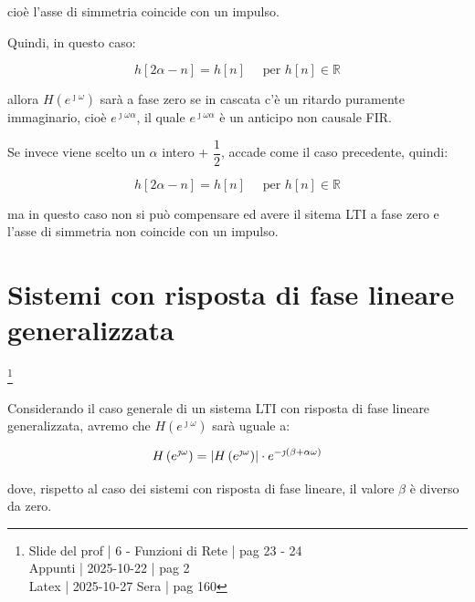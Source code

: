 cioè l'asse di simmetria coincide con un impulso. \newline 

Quindi, in questo caso: 

{
    \Large 
    \begin{equation}
        h \left[ 2 \alpha - n\right] = h \left[ n\right] \quad \text{ per } h \left[ n\right] \in \mathbb{R}
    \end{equation}
}

allora $H \left( e^{\jmath \omega}\right) $ sarà a fase zero se in cascata c'è un ritardo puramente immaginario, cioè $e^{\jmath \omega \alpha}$, 
il quale $e^{\jmath \omega \alpha}$ è un anticipo non causale FIR. \newline 

Se invece viene scelto un $\alpha$ intero + $\dfrac{1}{2}$, 
accade come il caso precedente, quindi: 

{
    \Large 
    \begin{equation}
        h \left[ 2 \alpha - n\right] = h \left[ n\right] \quad \text{ per } h \left[ n\right] \in \mathbb{R}
    \end{equation}
}

ma in questo caso non si può compensare ed avere il sitema LTI a fase zero e l'asse di simmetria non coincide con un impulso. \newline 

\newpage 

\section{Sistemi con risposta di fase lineare generalizzata}

\footnote{ 
    Slide del prof | 6 - Funzioni di Rete | pag 23 - 24\\
    Appunti | 2025-10-22 | pag 2 \\ 
    Latex | 2025-10-27 Sera | pag 160
} 

Considerando il caso generale di un sistema LTI con risposta di fase lineare generalizzata, 
avremo che $H \left( e^{\jmath \omega }\right)$ sarà uguale a: 

{
    \Large 
    \begin{equation}
        H \left( e^{\jmath \omega}\right)
        = 
        \abs{H \left(e^{\jmath \omega}\right)}
        \cdot 
        e^{- \jmath \left(\beta + \alpha \omega\right)} 
    \end{equation}
}

dove, rispetto al caso dei sistemi con risposta di fase lineare, il valore $\beta$ è diverso da zero. \newline 

